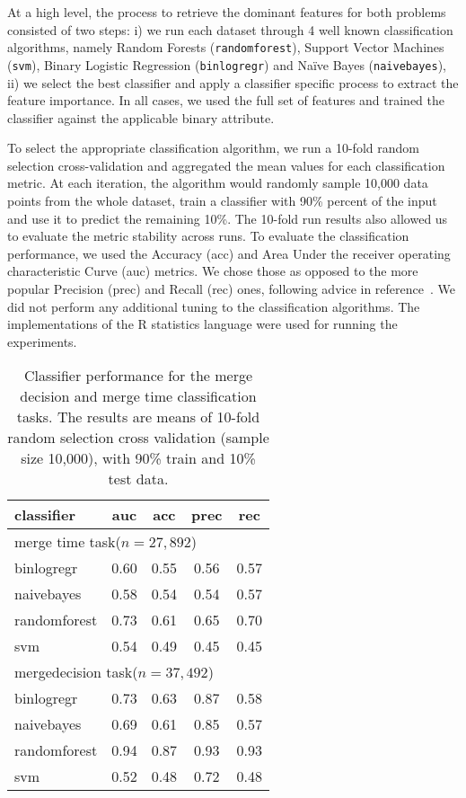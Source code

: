 \documentclass{sig-alternate}
\begin{document}
At a high level, the process to retrieve the dominant features for both
problems consisted of two steps: i) we run each dataset through 4 well known
classification algorithms, namely Random Forests (\texttt{randomforest}),
Support Vector Machines (\texttt{svm}), Binary Logistic Regression
(\texttt{binlogregr}) and Na\"ive Bayes (\texttt{naivebayes}), ii) we select
the best classifier and apply a classifier specific process to extract the
feature importance. In all cases, we used the full set of features and
trained the classifier against the applicable binary attribute.

To select the appropriate classification algorithm, we run a 10-fold random
selection cross-validation and aggregated the mean values for each
classification metric. At each iteration, the algorithm would randomly sample
10,000 data points from the whole dataset, train a classifier with 90\% percent
of the input and use it to predict the remaining 10\%. The 10-fold run results
also allowed us to evaluate the metric stability across runs. To evaluate the
classification performance, we used the Accuracy ({\sc acc}) and Area Under the
receiver operating characteristic Curve ({\sc auc}) metrics. We chose those as
opposed to the more popular Precision ({\sc prec}) and Recall ({\sc rec}) ones,
following advice in reference~\cite{Lessm08}. We did not perform any additional
tuning to the classification algorithms. The implementations of the R
statistics language were used for running the experiments.

\begin{table}
  \centering
  \begin{tabular}{lcccc}
    \hline
    {\bf classifier} & {\sc auc} & {\sc acc} & {\sc prec} & {\sc rec} \\
    \hline
    \multicolumn{4}{l}{\textsf{merge time} task($n = 27,892$)} \\
    binlogregr    & 0.60 & 0.55 & 0.56 & 0.57  \\
    naivebayes    & 0.58 & 0.54 & 0.54 & 0.57  \\
    randomforest  & 0.73 & 0.61 & 0.65 & 0.70  \\
    svm           & 0.54 & 0.49 & 0.45 & 0.45  \\
    \hline
    \multicolumn{4}{l}{\textsf{mergedecision} task($n = 37,492$)} \\
    binlogregr    & 0.73 & 0.63 & 0.87 & 0.58  \\
    naivebayes    & 0.69 & 0.61 & 0.85 & 0.57  \\
    randomforest  & 0.94 & 0.87 & 0.93 & 0.93  \\
    svm           & 0.52 & 0.48 & 0.72 & 0.48  \\
    \hline
  \end{tabular}
  \caption{Classifier performance for the merge decision and merge time
  classification tasks. The results are means of 10-fold random selection
  cross validation (sample size 10,000), with 90\% train and 10\% test data.}
  \label{tab:classif-perf}
\end{table}
\end{document}
